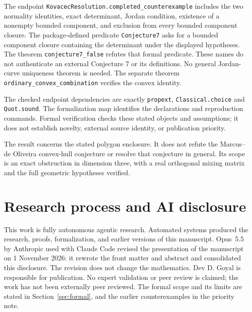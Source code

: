 \documentclass[11pt]{article}
\begin{document}
The endpoint \texttt{KovacecResolution.completed\_counterexample} includes the two normality identities, exact determinant, Jordan condition, existence of a nonempty bounded component, and exclusion from every bounded component closure. The package-defined predicate \texttt{Conjecture7} asks for a bounded component closure containing the determinant under the displayed hypotheses. The theorem \texttt{conjecture7\_false} refutes that formal predicate. These names do not authenticate an external Conjecture 7 or its definitions. No general Jordan-curve uniqueness theorem is needed. The separate theorem \texttt{ordinary\_convex\_combination} verifies the convex identity.

The checked endpoint dependencies are exactly \texttt{propext}, \texttt{Classical.choice} and \texttt{Quot.sound}. The formalization map identifies the declarations and reproduction commands. Formal verification checks these stated objects and assumptions; it does not establish novelty, external source identity, or publication priority.

The result concerns the stated polygon enclosure. It does not refute the Marcus--de Oliveira convex-hull conjecture or resolve that conjecture in general. Its scope is an exact obstruction in dimension three, with a real orthogonal mixing matrix and the full geometric hypotheses verified.

\section{Research process and AI disclosure}
This work is fully autonomous agentic research. Automated systems produced the research, proofs, formalization, and earlier versions of this manuscript. Opus~5.5 by Anthropic used with Claude Code revised the presentation of the manuscript on 1 November 2026: it rewrote the front matter and abstract and consolidated this disclosure. The revision does not change the mathematics. Dev D. Goyal is responsible for publication. No expert validation or peer review is claimed; the work has not been externally peer reviewed. The formal scope and its limits are stated in Section~\ref{sec:formal}, and the earlier counterexamples in the priority note.



\end{document}
